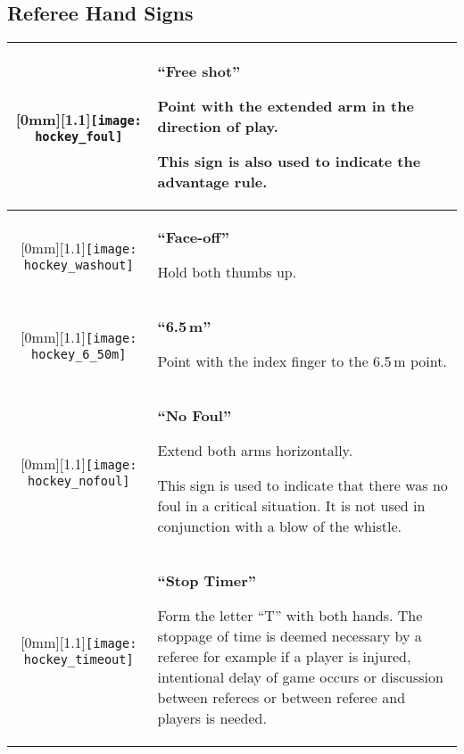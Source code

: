 \subsection{Referee Hand Signs}
\renewcommand{\arraystretch}{1.5}
\begin{longtable}{|c|p{10.8cm}|}

\hline %

\raisebox{-\height}[0mm][1.1\height]{\texttt{[image: hockey\_foul]}}
&
\textbf{``Free shot''}

Point with the extended arm in the direction of play.

This sign is also used to indicate the advantage rule.\\

\hline %

\raisebox{-\height}[0mm][1.1\height]{\texttt{[image: hockey\_washout]}}
&
\textbf{``Face-off''}

Hold both thumbs up.\\

\hline %

\raisebox{-\height}[0mm][1.1\height]{\texttt{[image: hockey\_6\_50m]}}
&
\textbf{``6.5\,m''}

Point with the index finger to the 6.5\,m point.\\

\hline %

\raisebox{-\height}[0mm][1.1\height]{\texttt{[image: hockey\_nofoul]}}
&
\textbf{``No Foul''}

Extend both arms horizontally.

This sign is used to indicate that there was no foul in a critical situation.
It is not used in conjunction with a blow of the whistle.\\

\hline %

\raisebox{-\height}[0mm][1.1\height]{\texttt{[image: hockey\_timeout]}}
&
\textbf{``Stop Timer''}

Form the letter “T” with both hands.
The stoppage of time is deemed necessary by a referee for example if a player is injured, intentional delay of game occurs or discussion between referees or between referee and players is needed.

\hline %


\end{longtable}
